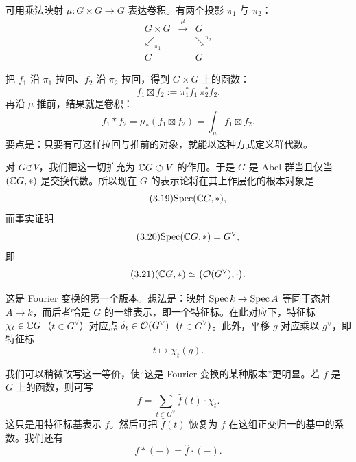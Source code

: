 可用乘法映射 $\mu\colon G\times G\to G$ 表达卷积。有两个投影 $\pi_1$ 与 $\pi_2$：
\begin{equation}\tag{3.16}
\begin{array}{ccc}
G\times G & \xrightarrow{\ \mu\ } & G\\
\swarrow_{\pi_1} & & \searrow^{\pi_2}\\
G & & G
\end{array}
\end{equation}

把 $f_1$ 沿 $\pi_1$ 拉回、$f_2$ 沿 $\pi_2$ 拉回，得到 $G\times G$ 上的函数：
\begin{equation}\tag{3.17}
f_1\boxtimes f_2:=\pi_1^{*}f_1\,\pi_2^{*}f_2.
\end{equation}
再沿 $\mu$ 推前，结果就是卷积：
\begin{equation}\tag{3.18}
f_1\ast f_2=\mu_{*}(f_1\boxtimes f_2)=\int_{\mu}f_1\boxtimes f_2.
\end{equation}
要点是：只要有可这样拉回与推前的对象，就能以这种方式定义群代数。

对 $G\circlearrowleft V$，我们把这一切扩充为 $\mathbb{C} G\circlearrowleft V$ 的作用。于是 $G$ 是 Abel 群当且仅当 $(\mathbb{C} G,\ast)$ 是交换代数。所以现在 $G$ 的表示论将在其上作层化的根本对象是
\begin{equation}\tag{3.19}
\mathrm{Spec}(\mathbb{C} G,\ast),
\end{equation}
而事实证明
\begin{equation}\tag{3.20}
\mathrm{Spec}(\mathbb{C} G,\ast)=G^{\vee},
\end{equation}
即
\begin{equation}\tag{3.21}
(\mathbb{C} G,\ast)\simeq\bigl(\mathcal{O}(G^{\vee}),\cdot\bigr).
\end{equation}

这是 Fourier 变换的第一个版本。想法是：映射 $\mathrm{Spec}\,k\to\mathrm{Spec}\,A$ 等同于态射 $A\to k$，而后者恰是 $G$ 的一维表示，即一个特征标。在此对应下，特征标 $\chi_t\in\mathbb{C} G$（$t\in G^{\vee}$）对应点 $\delta_t\in\mathcal{O}(G^{\vee})$（$t\in G^{\vee}$）。此外，平移 $g$ 对应乘以 $g^{\vee}$，即特征标
\begin{equation}\tag{3.22}
t\mapsto\chi_t(g).
\end{equation}

我们可以稍微改写这一等价，使“这是 Fourier 变换的某种版本”更明显。若 $f$ 是 $G$ 上的函数，则可写
\begin{equation}\tag{3.23}
f=\sum_{t\in G^{\vee}}\hat f(t)\cdot\chi_t.
\end{equation}
这只是用特征标基表示 $f$。然后可把 $\hat f(t)$ 恢复为 $f$ 在这组正交归一的基中的系数。我们还有
\begin{equation}\tag{3.24}
f\ast(-)=\hat f\cdot(-).
\end{equation}

